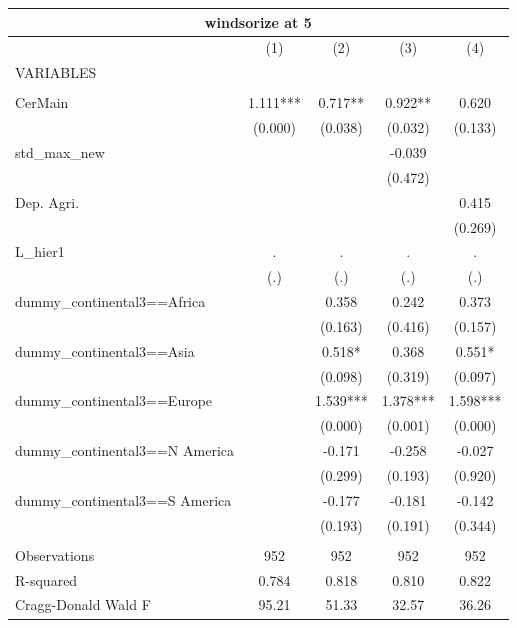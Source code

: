 \documentclass[12pt,a4paper]{article}
\begin{document}
\begin{tabular}{lcccc}
\multicolumn{5}{c}{windsorize at 5} \\ \hline
 & (1) & (2) & (3) & (4) \\
VARIABLES &  &  &  &  \\ \hline
 &  &  &  &  \\
CerMain & 1.111*** & 0.717** & 0.922** & 0.620 \\
 & (0.000) & (0.038) & (0.032) & (0.133) \\
std\_max\_new &  &  & -0.039 &  \\
 &  &  & (0.472) &  \\
Dep. Agri. &  &  &  & 0.415 \\
 &  &  &  & (0.269) \\
L\_hier1 & . & . & . & . \\
 & (.) & (.) & (.) & (.) \\
dummy\_continental3==Africa &  & 0.358 & 0.242 & 0.373 \\
 &  & (0.163) & (0.416) & (0.157) \\
dummy\_continental3==Asia &  & 0.518* & 0.368 & 0.551* \\
 &  & (0.098) & (0.319) & (0.097) \\
dummy\_continental3==Europe &  & 1.539*** & 1.378*** & 1.598*** \\
 &  & (0.000) & (0.001) & (0.000) \\
dummy\_continental3==N America &  & -0.171 & -0.258 & -0.027 \\
 &  & (0.299) & (0.193) & (0.920) \\
dummy\_continental3==S America &  & -0.177 & -0.181 & -0.142 \\
 &  & (0.193) & (0.191) & (0.344) \\
 &  &  &  &  \\
Observations & 952 & 952 & 952 & 952 \\
R-squared & 0.784 & 0.818 & 0.810 & 0.822 \\
 Cragg-Donald Wald F & 95.21 & 51.33 & 32.57 & 36.26 \\ \hline
\end{tabular}
\end{document}
